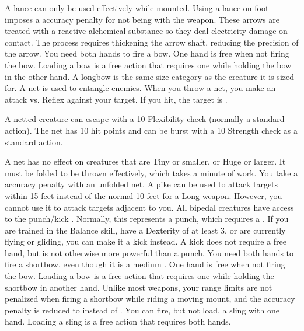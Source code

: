          A lance can only be used effectively while mounted.
        Using a lance on foot imposes a  accuracy penalty for not being  with the weapon.
         These arrows are treated with a reactive alchemical substance so they deal electricity damage on contact.
        The process requires thickening the arrow shaft, reducing the precision of the arrow.
         You need both hands to fire a bow. One hand is free when not firing the bow. Loading a bow is a free action that requires one  while holding the bow in the other hand.
        A longbow is the same size category as the creature it is sized for.
         A net is used to entangle enemies. When you throw a net, you make an attack vs. Reflex against your target. If you hit, the target is \slowed.
        \par A netted creature can escape with a  10 Flexibility check (normally a standard action). The net has 10 hit points and can be burst with a  10 Strength check as a standard action.
        \par A net has no effect on creatures that are Tiny or smaller, or Huge or larger. It must be folded to be thrown effectively, which takes a minute of work. You take a  accuracy penalty with an unfolded net.
         A pike can be used to attack targets within 15 feet instead of the normal 10 feet for a Long weapon.
        However, you cannot use it to attack targets adjacent to you.
         All bipedal creatures have access to the punch/kick .
        Normally, this represents a punch, which requires a .
        If you are trained in the Balance skill, have a Dexterity of at least 3, or are currently flying or gliding, you can make it a kick instead.
        A kick does not require a free hand, but is not otherwise more powerful than a punch.
         You need both hands to fire a shortbow, even though it is a medium . One hand is free when not firing the bow. Loading a bow is a free action that requires one  while holding the shortbow in another hand.
        Unlike most  weapons, your range limits are not penalized when firing a shortbow while riding a moving mount, and the accuracy penalty is reduced to  instead of .
         You can fire, but not load, a sling with one hand. Loading a sling is a free action that requires both hands.
